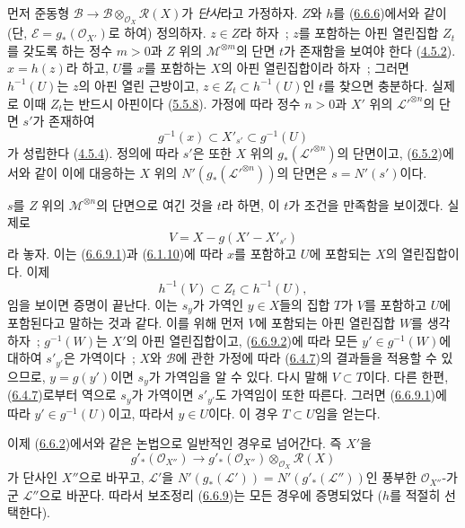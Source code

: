먼저 준동형
$\mathcal{B}\to
\mathcal{B}\otimes_{\mathcal{O}_X}\mathcal{R}(X)$가 \emph{단사}라고
가정하자. $Z$와 $h$를 (\hyperref[II.6.6.6-ko]{6.6.6})에서와 같이
(단, $\mathcal{E}=g_*(\mathcal{O}_{X'})$로 하여) 정의하자.
$z\in Z$라 하자~; $z$를 포함하는 아핀 열린집합 $Z_t$를 갖도록 하는
정수 $m>0$과 $Z$ 위의 $\mathcal{M}^{\otimes m}$의 단면 $t$가 존재함을
보여야 한다 (\hyperref[II.4.5.2-ko]{4.5.2}). $x=h(z)$라 하고, $U$를
$x$를 포함하는 $X$의 아핀 열린집합이라 하자~; 그러면 $h^{-1}(U)$는
$z$의 아핀 열린 근방이고, $z\in Z_t\subset h^{-1}(U)$인 $t$를 찾으면
충분하다. 실제로 이때 $Z_t$는 반드시 아핀이다
(\hyperref[II.5.5.8-ko]{5.5.8}). 가정에 따라 정수 $n>0$과 $X'$ 위의
${\mathcal{L}'}^{\otimes n}$의 단면 $s'$가 존재하여
\[
\label{II.6.6.9.1-ko}
g^{-1}(x)\subset X'_{s'}\subset g^{-1}(U)
\tag{6.6.9.1}
\]
가 성립한다 (\hyperref[II.4.5.4-ko]{4.5.4}). 정의에 따라 $s'$은 또한
$X$ 위의 $g_*({\mathcal{L}'}^{\otimes n})$의 단면이고,
(\hyperref[II.6.5.2-ko]{6.5.2})에서와 같이 이에 대응하는 $X$ 위의
$N'(g_*({\mathcal{L}'}^{\otimes n}))$의 단면은
$s=N'(s')$이다.


$s$를 $Z$ 위의 $\mathcal{M}^{\otimes n}$의 단면으로 여긴 것을 $t$라
하면, 이 $t$가 조건을 만족함을 보이겠다. 실제로
\[
\label{II.6.6.9.2-ko}
V=X-g(X'-X'_{s'})
\tag{6.6.9.2}
\]
라 놓자. 이는 (\hyperref[II.6.6.9.1-ko]{6.6.9.1})과
(\hyperref[II.6.1.10-ko]{6.1.10})에 따라 $x$를 포함하고 $U$에 포함되는
$X$의 열린집합이다. 이제
\[
\label{II.6.6.9.3-ko}
h^{-1}(V)\subset Z_t\subset h^{-1}(U),
\tag{6.6.9.3}
\]
임을 보이면 증명이 끝난다. 이는 $s_y$가 가역인 $y\in X$들의 집합
$T$가 $V$를 포함하고 $U$에 포함된다고 말하는 것과 같다. 이를 위해
먼저 $V$에 포함되는 아핀 열린집합 $W$를 생각하자~; $g^{-1}(W)$는
$X'$의 아핀 열린집합이고, (\hyperref[II.6.6.9.2-ko]{6.6.9.2})에 따라
모든 $y'\in g^{-1}(W)$에 대하여 $s'_{y'}$은 가역이다~; $X$와
$\mathcal{B}$에 관한 가정에 따라 (\hyperref[II.6.4.7-ko]{6.4.7})의
결과들을 적용할 수 있으므로, $y=g(y')$이면 $s_y$가 가역임을 알 수
있다. 다시 말해 $V\subset T$이다. 다른 한편,
(\hyperref[II.6.4.7-ko]{6.4.7})로부터 역으로 $s_y$가 가역이면
$s'_{y'}$도 가역임이 또한 따른다. 그러면
(\hyperref[II.6.6.9.1-ko]{6.6.9.1})에 따라 $y'\in g^{-1}(U)$이고,
따라서 $y\in U$이다. 이 경우 $T\subset U$임을 얻는다.

이제 (\hyperref[II.6.6.2-ko]{6.6.2})에서와 같은 논법으로 일반적인
경우로 넘어간다. 즉 $X'$을
\[
g'_*(\mathcal{O}_{X''})\longrightarrow
g'_*(\mathcal{O}_{X''})\otimes_{\mathcal{O}_X}\mathcal{R}(X)
\]
가 단사인 $X''$으로 바꾸고, $\mathcal{L}'$을
$N'(g_*(\mathcal{L}'))=N'(g'_*(\mathcal{L}''))$인 풍부한
$\mathcal{O}_{X''}$-가군 $\mathcal{L}''$으로 바꾼다. 따라서 보조정리
(\hyperref[II.6.6.9-ko]{6.6.9})는 모든 경우에 증명되었다
($h$를 적절히 선택한다).

